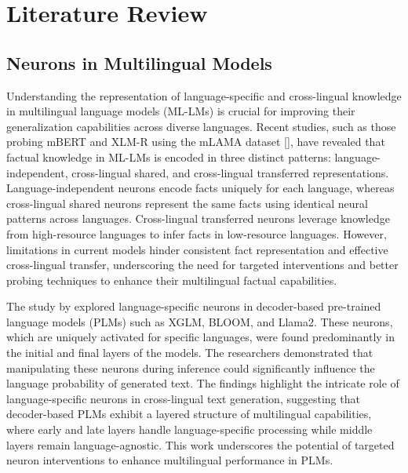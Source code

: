 
\chapter{Literature Review}\singlespacing %

\label{Chapter2} %


\section{Neurons in Multilingual Models}
Understanding the representation of language-specific and cross-lingual knowledge in multilingual language models (ML-LMs) is crucial for improving their generalization capabilities across diverse languages. Recent studies, such as those probing mBERT and XLM-R using the mLAMA dataset [\cite{zhao2024tracing}], have revealed that factual knowledge in ML-LMs is encoded in three distinct patterns: language-independent, cross-lingual shared, and cross-lingual transferred representations. Language-independent neurons encode facts uniquely for each language, whereas cross-lingual shared neurons represent the same facts using identical neural patterns across languages. Cross-lingual transferred neurons leverage knowledge from high-resource languages to infer facts in low-resource languages. However, limitations in current models hinder consistent fact representation and effective cross-lingual transfer, underscoring the need for targeted interventions and better probing techniques to enhance their multilingual factual capabilities.

The study by \cite{kojima2024} explored language-specific neurons in decoder-based pre-trained language models (PLMs) such as XGLM, BLOOM, and Llama2. These neurons, which are uniquely activated for specific languages, were found predominantly in the initial and final layers of the models. The researchers demonstrated that manipulating these neurons during inference could significantly influence the language probability of generated text. The findings highlight the intricate role of language-specific neurons in cross-lingual text generation, suggesting that decoder-based PLMs exhibit a layered structure of multilingual capabilities, where early and late layers handle language-specific processing while middle layers remain language-agnostic. This work underscores the potential of targeted neuron interventions to enhance multilingual performance in PLMs.

